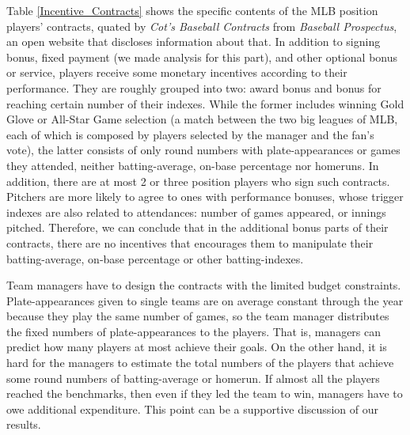 \documentclass[dvipdfmx, 12pt]{article}
\begin{document}
Table \ref{Incentive_Contracts} shows the specific contents of the MLB position players' contracts, quated by \textit{Cot's Baseball Contracts} from \textit{Baseball Prospectus}, an open website that discloses information about that. In addition to signing bonus, fixed payment (we made analysis for this part), and other optional bonus or service, players receive some monetary incentives according to their performance. They are roughly grouped into two: award bonus and bonus for reaching certain number of their indexes. While the former includes winning Gold Glove or All-Star Game selection (a match between the two big leagues of MLB, each of which is composed by players selected by the manager and the fan's vote), the latter consists of only round numbers with plate-appearances or games they attended, neither batting-average, on-base percentage nor homeruns. In addition, there are at most 2 or three position players who sign such contracts. Pitchers are more likely to agree to ones with performance bonuses, whose trigger indexes are also related to attendances: number of games appeared, or innings pitched. Therefore, we can conclude that in the additional bonus parts of their contracts, there are no incentives that encourages them to manipulate their batting-average, on-base percentage or other batting-indexes.

Team managers have to design the contracts with the limited budget constraints. Plate-appearances given to single teams are on average constant through the year because they play the same number of games, so the team manager distributes the fixed numbers of plate-appearances to the players. That is, managers can predict how many players at most achieve their goals. On the other hand, it is hard for the managers to estimate the total numbers of the players that achieve some round numbers of batting-average or homerun. If almost all the players reached the benchmarks, then even if they led the team to win, managers have to owe additional expenditure. This point can be a supportive discussion of our results.
\end{document}
